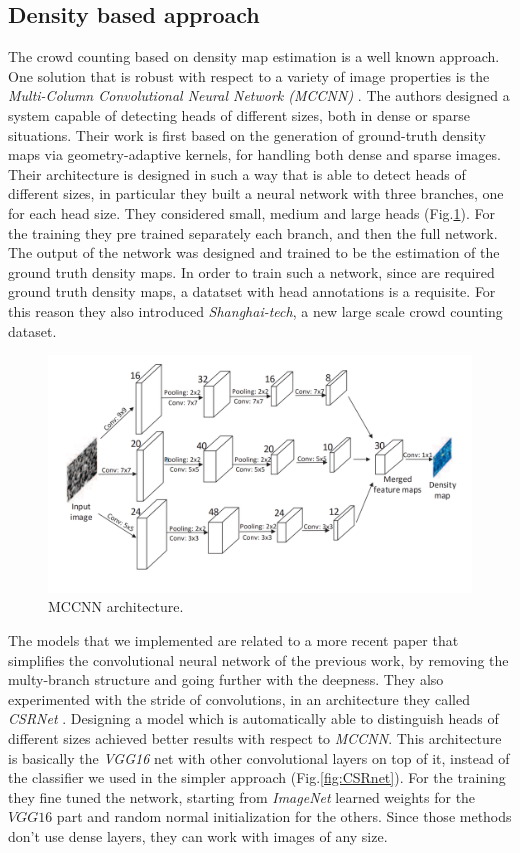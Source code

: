 \documentclass[10pt,twocolumn,letterpaper]{article}
\begin{document}
\subsection{Density based approach}
The crowd counting based on density map estimation is a well known approach. One solution that is robust with respect to a variety of image properties is the \textit{Multi-Column Convolutional Neural Network (MCCNN)} \cite{zhang2016single}. The authors designed a system capable of detecting heads of different sizes, both in dense or sparse situations. Their work is first based on the generation of ground-truth density maps via geometry-adaptive kernels, for handling both dense and sparse images. Their architecture is designed in such a way that is able to detect heads of different sizes, in particular they built a neural network with three branches, one for each head size. They considered small, medium and large heads (Fig.\ref{fig:MCCNN}). For the training they pre trained separately each branch, and then the full network. The output of the network was designed and trained to be the estimation of the ground truth density maps. In order to train such a network, since are required ground truth density maps, a datatset with head annotations is a requisite. For this reason they also introduced \textit{Shanghai-tech}, a new large scale crowd counting dataset. 

\begin{figure}[h!]
	\includegraphics[width=\linewidth]{pics/MCCNN.png}
	\caption{MCCNN architecture.}
	\label{fig:MCCNN}
\end{figure}


 The models that we implemented are related to a more recent paper that simplifies the convolutional neural network of the previous work, by removing the multy-branch structure and going further with the deepness. They also experimented with the stride of convolutions, in an architecture they called \textit{CSRNet} \cite{li2018csrnet}. Designing a model which is automatically able to distinguish heads of different sizes achieved better results with respect to \textit{MCCNN}. This architecture is basically the \textit{VGG16} net with other convolutional layers on top of it, instead of the classifier we used in the simpler approach (Fig.\ref{fig:CSRnet}). For the training they fine tuned the network, starting from \textit{ImageNet} learned weights for the $VGG16$ part and random normal initialization for the others. Since those methods \cite{zhang2016single,li2018csrnet} don't use dense layers, they can work with images of any size.
\end{document}
